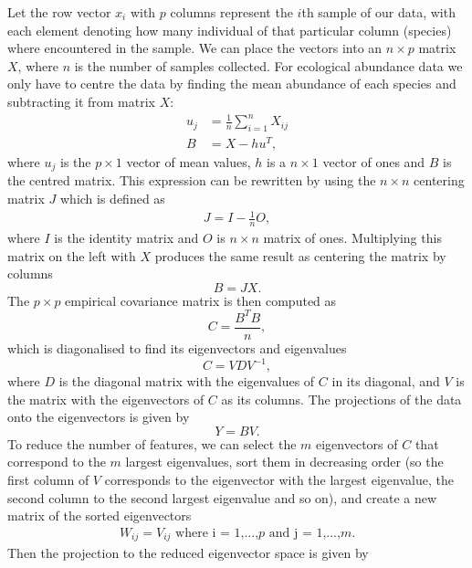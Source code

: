 Let the row vector $x_i$ with $p$ columns represent the $i$th sample of our data, with each element denoting how many individual of that particular column (species) where encountered in the sample. We can place the vectors into an $n \times p$ matrix $X$, where $n$ is the number of samples collected. For ecological abundance data we only have to centre the data by finding the mean abundance of each species and subtracting it from matrix $X$:
\begin{align}
\label{eq:columnmean}
u_j &= \frac{1}{n} \sum_{i = 1}^{n} X_{ij} \\
B &= X - h u^T,
\end{align}
where  $u_j$ is the $p\times 1$ vector of mean values, $h$ is a $n \times 1$ vector of ones and $B$ is the centred matrix. This expression can be rewritten by using the $n \times n$ centering matrix $J$ which is defined as
\begin{align}
J = I - \frac{1}{n}O,
\end{align}
where $I$ is the identity matrix and $O$ is $n \times n$ matrix of ones. Multiplying this matrix on the left with $X$ produces the same result as centering the matrix by columns
\begin{equation}
B = JX.
\end{equation}
The $p\times p$ empirical covariance matrix is then computed as
\begin{equation}
C = \frac{B^T B}{n},
\end{equation}
which is diagonalised to find its eigenvectors and eigenvalues 
\begin{equation}
C = VDV^{-1},
\end{equation}
where $D$ is the diagonal matrix with the eigenvalues of $C$ in its diagonal, and $V$ is the matrix with the eigenvectors of $C$ as its columns. The projections of the data onto the eigenvectors is given by 
\begin{equation}
Y = BV.
\end{equation}
To reduce the number of features, we can select the $m$ eigenvectors of $C$ that correspond to the $m$ largest eigenvalues, sort them in decreasing order (so the first column of $V$ corresponds to the eigenvector with the largest eigenvalue, the second column to the second largest eigenvalue and so on), and create a new matrix of the sorted eigenvectors
\begin{align}
W_{ij} = V_{ij} \text{ where i = 1,...,$p$ and j = 1,...,$m$}.
\end{align}
Then the projection to the reduced eigenvector space is given by

